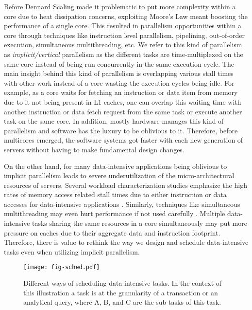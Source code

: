 \documentclass[11pt]{article}
\begin{document}
Before Dennard Scaling made it problematic to put more complexity within a core due to heat dissipation concerns,
exploiting Moore's Law meant boosting the performance of a single core.
This resulted in parallelism opportunities within a core through techniques like
instruction level parallelism, pipelining, out-of-order execution, simultaneous multithreading, etc.
We refer to this kind of parallelism as \textit{implicit/vertical} parallelism
as the different tasks are time-multiplexed on the same core
instead of being run concurrently in the same execution cycle.
The main insight behind this kind of parallelism is overlapping various stall times with other work
instead of a core wasting the execution cycles being idle.
For example, as a core waits for fetching an instruction or data item from memory due to it not being present in L1 caches,
one can overlap this waiting time with another instruction or data fetch request from the same task
or execute another task on the same core.
In addition, mostly hardware manages this kind of parallelism and software has the luxury to be oblivious to it.
Therefore, before multicores emerged,
the software systems got faster with each new generation of servers without having to make fundamental design changes.

On the other hand, 
for many data-intensive applications being oblivious to implicit parallelism leads to severe underutilization of
the micro-architectural resources of servers.
Several workload characterization studies emphasize the high rates of memory access related stall times
due to either instruction or data accesses for data-intensive applications \cite{Ferdman+12, SirinTPA16}.
Similarly, techniques like simultaneous multithreading may even hurt performance if not used carefully \cite{ZhouCRS05}.
Multiple data-intensive tasks sharing the same resources in a core simultaneously may put more pressure on caches
due to their aggregate data and instruction footprint.
Therefore,
there is value to rethink the way we design and schedule data-intensive tasks even when utilizing implicit parallelism.

\begin{figure}
\centering
\texttt{[image: fig-sched.pdf]}
\caption{Different ways of scheduling data-intensive tasks.
In the context of this illustration a task is at the granularity of a transaction or an analytical query,
where A, B, and C are the sub-tasks of this task.}
\label{fig:sched}
\end{figure}
\end{document}
